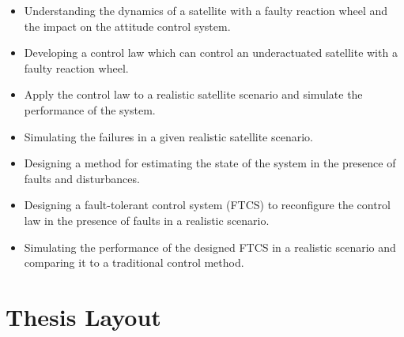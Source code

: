 \begin{itemize}
    \item Understanding the dynamics of a satellite with a faulty reaction wheel and the impact on the attitude control system.
    \item Developing a control law which can control an underactuated satellite with a faulty reaction wheel.
    \item Apply the control law to a realistic satellite scenario and simulate the performance of the system.

 \item Simulating the failures in a given realistic satellite scenario.
 \item Designing a method for estimating the state of the system in the presence of faults and disturbances.
 \item Designing a fault-tolerant control system (FTCS) to reconfigure the control law in the presence of faults in a realistic scenario.
 \item Simulating the performance of the designed FTCS in a realistic scenario and comparing it to a traditional control method.
\end{itemize}

\section{Thesis Layout}


